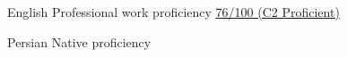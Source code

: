 
\begin{cvlanguages}

  \cvlanguage
    {English} %
    {Professional work proficiency} %
    {\href{https://cert.efset.org/en/Qaic3y}{ 76/100 (C2 Proficient)}}

  \cvlanguage
    {Persian} %
    {Native proficiency} %
    {}
    
\end{cvlanguages}
